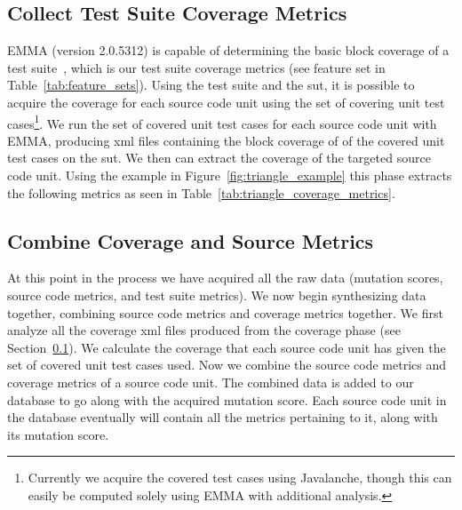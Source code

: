 \subsection{Collect Test Suite Coverage Metrics}
\label{subsec:approach_collect_coverage_metrics}
EMMA (version 2.0.5312) is capable of determining the basic block coverage of a test suite~\cite{EMMA}, which is our test suite coverage metrics (see feature set  in Table~\ref{tab:feature_sets}). Using the test suite and the \gls{sut}, it is possible to acquire the coverage for each source code unit using the set of covering unit test cases\footnote{Currently we acquire the covered test cases using Javalanche, though this can easily be computed solely using EMMA with additional analysis.}. We run the set of covered unit test cases for each source code unit with EMMA, producing \gls{xml} files containing the block coverage of of the covered unit test cases on the \gls{sut}. We then can extract the coverage of the targeted source code unit. Using the example in Figure~\ref{fig:triangle_example} this phase extracts the following metrics as seen in Table~\ref{tab:triangle_coverage_metrics}.


\subsection{Combine Coverage and Source Metrics}
\label{subsec:approach_combine_metrics}
At this point in the process we have acquired all the raw data (mutation scores, source code metrics, and test suite metrics). We now begin synthesizing data together, combining source code metrics and coverage metrics together. We first analyze all the coverage \gls{xml} files produced from the coverage phase (see Section~\ref{subsec:approach_collect_coverage_metrics}). We calculate the coverage that each source code unit has given the set of covered unit test cases used. Now we combine the source code metrics and coverage metrics of a source code unit. The combined data is added to our database to go along with the acquired mutation score. Each source code unit in the database eventually will contain all the metrics pertaining to it, along with its mutation score.

